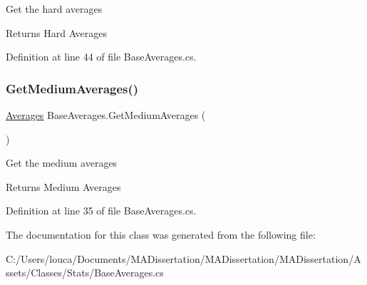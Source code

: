 Get the hard averages 

\begin{DoxyReturn}{Returns}
Hard Averages
\end{DoxyReturn}


Definition at line 44 of file Base\+Averages.\+cs.

\mbox{\label{class_base_averages_a1eebd8734dbf18c96295bd93589bcd94}} 
\subsubsection{\texorpdfstring{Get\+Medium\+Averages()}{GetMediumAverages()}}
{\footnotesize\ttfamily \mbox{\hyperlink{struct_level_generation_1_1_averages}{Averages}} Base\+Averages.\+Get\+Medium\+Averages (\begin{DoxyParamCaption}{ }\end{DoxyParamCaption})}



Get the medium averages 

\begin{DoxyReturn}{Returns}
Medium Averages
\end{DoxyReturn}


Definition at line 35 of file Base\+Averages.\+cs.



The documentation for this class was generated from the following file\+:\begin{DoxyCompactItemize}
\item 
C\+:/\+Users/louca/\+Documents/\+M\+A\+Dissertation/\+M\+A\+Dissertation/\+M\+A\+Dissertation/\+Assets/\+Classes/\+Stats/Base\+Averages.\+cs\end{DoxyCompactItemize}
